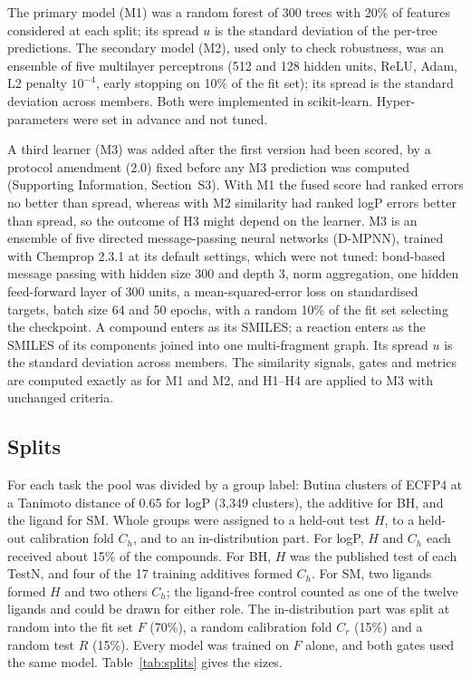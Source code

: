\documentclass[11pt,letterpaper]{article}
\begin{document}
The primary model (M1) was a random forest\cite{breiman2001} of 300 trees with 20\% of features considered at each split; its spread $u$ is the standard deviation of the per-tree predictions. The secondary model (M2), used only to check robustness, was an ensemble of five multilayer perceptrons (512 and 128 hidden units, ReLU, Adam, L2 penalty $10^{-4}$, early stopping on 10\% of the fit set); its spread is the standard deviation across members.\cite{lakshminarayanan2017} Both were implemented in scikit-learn.\cite{pedregosa2011} Hyper-parameters were set in advance and not tuned.

A third learner (M3) was added after the first version had been scored, by a protocol amendment (2.0) fixed before any M3 prediction was computed (Supporting Information, Section~S3). With M1 the fused score had ranked errors no better than spread, whereas with M2 similarity had ranked logP errors better than spread, so the outcome of H3 might depend on the learner. M3 is an ensemble of five directed message-passing neural networks (D-MPNN),\cite{yang2019} trained with Chemprop 2.3.1\cite{heid2024chemprop} at its default settings, which were not tuned: bond-based message passing with hidden size 300 and depth 3, norm aggregation, one hidden feed-forward layer of 300 units, a mean-squared-error loss on standardised targets, batch size 64 and 50 epochs, with a random 10\% of the fit set selecting the checkpoint. A compound enters as its SMILES; a reaction enters as the SMILES of its components joined into one multi-fragment graph. Its spread $u$ is the standard deviation across members. The similarity signals, gates and metrics are computed exactly as for M1 and M2, and H1--H4 are applied to M3 with unchanged criteria.

\subsection{Splits}

\begin{table}[t]
\centering
\caption{Datasets and splits. Sizes are means over five seeds. $F$: fit set; $C_r$: random calibration fold; $C_h$: held-out calibration fold; $R$: random (in-distribution) test; $H$: held-out test.}
\label{tab:splits}
\resizebox{\linewidth}{!}{}
\end{table}

For each task the pool was divided by a group label: Butina clusters\cite{butina1999} of ECFP4 at a Tanimoto distance of 0.65 for logP (3,349 clusters), the additive for BH, and the ligand for SM. Whole groups were assigned to a held-out test $H$, to a held-out calibration fold $C_h$, and to an in-distribution part. For logP, $H$ and $C_h$ each received about 15\% of the compounds. For BH, $H$ was the published test of each TestN, and four of the 17 training additives formed $C_h$. For SM, two ligands formed $H$ and two others $C_h$; the ligand-free control counted as one of the twelve ligands and could be drawn for either role. The in-distribution part was split at random into the fit set $F$ (70\%), a random calibration fold $C_r$ (15\%) and a random test $R$ (15\%). Every model was trained on $F$ alone, and both gates used the same model. Table~\ref{tab:splits} gives the sizes.
\end{document}

